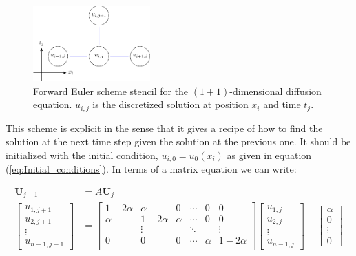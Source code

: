 \documentclass[a4paper, 11pt, notitlepage,english]{article}
\begin{document}
\begin{figure}[h!tb]
 \centering
 \includegraphics[width=0.4\textwidth]{Grid_FE-figure0}
 \caption{Forward Euler scheme stencil for the $(1+1)$-dimensional diffusion equation. $u_{i,j}$ is the discretized solution at position $x_i$ and time $t_j$.}
 \label{fig:FE_grid}
\end{figure}

This scheme is explicit in the sense that it gives a recipe of how to find the solution at the next time step given the solution at the previous one. It should be initialized with the initial condition, $u_{i,0} = u_0(x_i)$ as given in equation (\ref{eq:Initial_conditions}). In terms of a matrix equation we can write:

\begin{align}
\boldsymbol{U}_{j+1} &= A \boldsymbol{U}_j \\
\begin{bmatrix}
u_{1,j+1} \\ u_{2,j+1} \\ \vdots \\ u_{n-1,j+1}
\end{bmatrix}
&=
\begin{bmatrix}
 1-2\alpha & \alpha & 0 & \cdots & 0 & 0 \\
 \alpha & 1-2\alpha & \alpha & \cdots & 0 & 0 \\
  & \vdots & & \ddots & & \vdots \\
 0 & 0 & 0 & \cdots & \alpha & 1-2\alpha \\
\end{bmatrix}
\begin{bmatrix}
u_{1,j} \\ u_{2,j} \\ \vdots \\ u_{n-1,j}
\end{bmatrix}
+
\begin{bmatrix}
\alpha \\ 0 \\ \vdots \\ 0
\end{bmatrix}
\label{eq:Forward_Euler_matrix}
\end{align}
\end{document}
